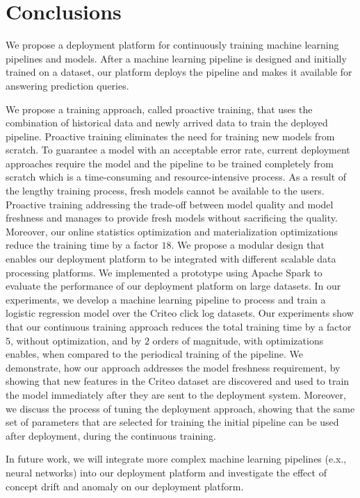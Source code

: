 \section{Conclusions} \label{conclusion}
We propose a deployment platform for continuously training machine learning pipelines and models.
After a machine learning pipeline is designed and initially trained on a dataset, our platform deploys the pipeline and makes it available for answering prediction queries.

We propose a training approach, called proactive training, that uses the combination of historical data and newly arrived data to train the deployed pipeline.
Proactive training eliminates the need for training new models from scratch.
To guarantee a model with an acceptable error rate, current deployment approaches require the model and the pipeline to be trained completely from scratch which is a time-consuming and resource-intensive process.
As a result of the lengthy training process, fresh models cannot be available to the users.
Proactive training addressing the trade-off between model quality and model freshness and manages to provide fresh models without sacrificing the quality. 
Moreover, our online statistics optimization and materialization optimizations reduce the training time by a factor $18$.
We propose a modular design that enables our deployment platform to be integrated with different scalable data processing platforms.
We implemented a prototype using Apache Spark to evaluate the performance of our deployment platform on large datasets.
In our experiments, we develop a machine learning pipeline to process and train a logistic regression model over the Criteo click log datasets.
Our experiments show that our continuous training approach reduces the total training time by a factor $5$, without optimization, and by $2$ orders of magnitude, with optimizations enables, when compared to the periodical training of the pipeline.
We demonstrate, how our approach addresses the model freshness requirement, by showing that new features in the Criteo dataset are discovered and used to train the model immediately after they are sent to the deployment system.
Moreover, we discuss the process of tuning the deployment approach, showing that the same set of parameters that are selected for training the initial pipeline can be used after deployment, during the continuous training.

In future work, we will integrate more complex machine learning pipelines (e.x., neural networks) into our deployment platform and investigate the effect of concept drift and anomaly on our deployment platform.

